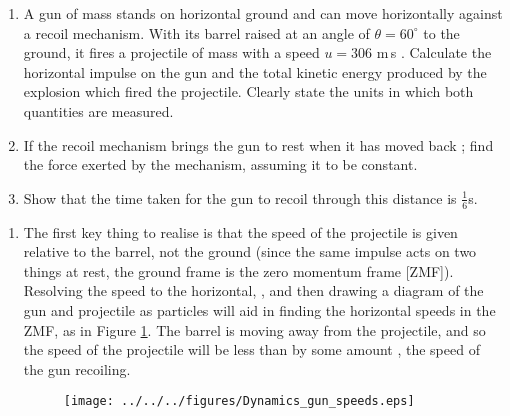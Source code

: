 
\begin{problem}[A1972AMIIQ2l] %
{\begin{enumerate}
	\item A gun of mass  stands on horizontal ground and can move horizontally against a recoil mechanism. With its barrel raised at an angle of $\theta=60^{\circ}$ to the ground, it fires a projectile of mass  with a speed $u={306}$ {m\,s} . Calculate the horizontal impulse on the gun and the total kinetic energy produced by the explosion which fired the projectile. Clearly state the units in which both quantities are measured.
	\item If the recoil mechanism brings the gun to rest when it has moved back ; find the force exerted by the mechanism, assuming it to be constant.
	\item Show that the time taken for the gun to recoil through this distance is $\frac{1}{6}${s}.
\end{enumerate}
}
{}
{\begin{enumerate}
	\item The first key thing to realise is that the speed of the projectile is given relative to the barrel, not the ground (since the same impulse acts on two things at rest, the ground frame is the zero momentum frame [ZMF]). Resolving the speed to the horizontal, , and then drawing a diagram of the gun and projectile as particles will aid in finding the horizontal speeds in the ZMF, as in Figure \ref{fig:Dynamics_gun_speeds}. The barrel is moving away from the projectile, and so the speed of the projectile will be less than  by some amount , the speed of the gun recoiling.

\begin{figure}[h]
\centering
\texttt{[image: ../../../figures/Dynamics\_gun\_speeds.eps]}
\caption{}
\label{fig:Dynamics_gun_speeds}
\end{figure}


\end{enumerate}}
\end{problem}
